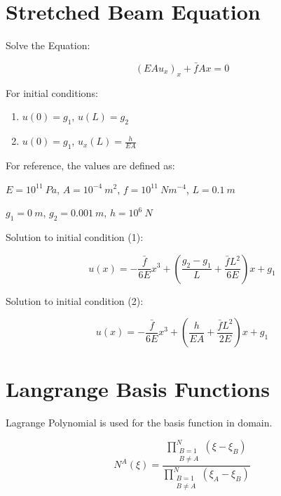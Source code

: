 \documentclass[letterpaper]{report}
\begin{document}
\chapter{Stretched Beam Equation}

Solve the Equation:

\begin{equation}
\left(EA u_x \right)_x + \bar{f}Ax = 0
\end{equation}

For initial conditions:

\begin{enumerate}
\item $u(0) = g_1$, $u(L) = g_2$
\item $u(0) = g_1$, $u_x(L) = \frac{h}{EA}$
\end{enumerate}

For reference, the values are defined as:

\vspace{0.3in}
$E = 10^{11}~Pa$, $A = 10^{-4}~m^2$, $f = 10^{11}~Nm^{-4}$, $L = 0.1~m$

$g_1 = 0~m$, $g_2 = 0.001~m$, $h = 10^6~N$

\vspace{0.3in}
Solution to initial condition (1):

\begin{equation}
u(x) = -\frac{\bar{f}}{6E} x^3 + \left( \frac{g_2-g_1}{L} + \frac{\bar{f}L^2}{6E} \right) x + g_1
\end{equation}

Solution to initial condition (2):

\begin{equation}
u(x) = -\frac{\bar{f}}{6E} x^3 + \left( \frac{h}{EA}+\frac{\bar{f}L^2}{2E} \right) x + g_1
\end{equation}

\chapter{Langrange Basis Functions}

Lagrange Polynomial is used for the basis function in domain.

\begin{equation}
N^A(\xi) = \frac{\prod\limits_{\substack{B=1 \\ B\ne A}}^{N} (\xi-\xi_B)}{\prod\limits_{\substack{B=1 \\ B \ne A}}^{N} (\xi_A-\xi_B)}
\end{equation}
\end{document}
